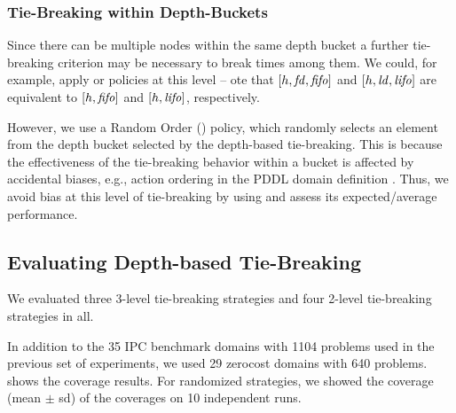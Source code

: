 \subsubsection{Tie-Breaking within Depth-Buckets} %
Since there can be multiple nodes within the same depth bucket
a further tie-breaking criterion may be necessary to break times among them.
We could, for example, apply \lifo or \fifo policies at this level -- 
ote that $[h,\mbox{\textit{fd}},\mbox{\textit{fifo}}]$ and $[h,\mbox{\textit{ld}},\mbox{\textit{lifo}}]$ are equivalent to $[h,\mbox{\textit{fifo}}]$ and $[h,\mbox{\textit{lifo}}]$, respectively.

However, 
we use a Random Order (\ro) policy, which 
randomly selects an element from the depth bucket selected by the depth-based tie-breaking.
This is because the effectiveness of the tie-breaking behavior within a bucket
is affected by accidental biases, e.g., action ordering in the PDDL domain
definition \cite{vallati2015effective}.
Thus, we avoid bias at this level of tie-breaking by using \ro and assess its expected/average
performance.





\subsection{Evaluating Depth-based Tie-Breaking}
\label{sec:depth-based-evaluation}
We evaluated three 3-level tie-breaking strategies and four 2-level
tie-breaking strategies in all.

% 
In addition to the 35 IPC benchmark domains with 1104 problems used in
the previous set of experiments, we used 29 zerocost domains with 640
problems.   shows the coverage results. For randomized strategies, we
showed the coverage (mean $\pm$ sd) of the coverages on
10 independent runs.

